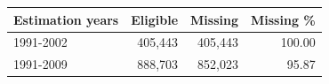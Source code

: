 \begingroup\small\setlength{\tabcolsep}{3pt}
\begin{tabularx}{\linewidth}{Xrrr}\toprule
Estimation years & Eligible & Missing & Missing \% \\ \midrule
1991-2002 & 405,443 & 405,443 & 100.00 \\
1991-2009 & 888,703 & 852,023 & 95.87 \\
\bottomrule\end{tabularx}\endgroup
